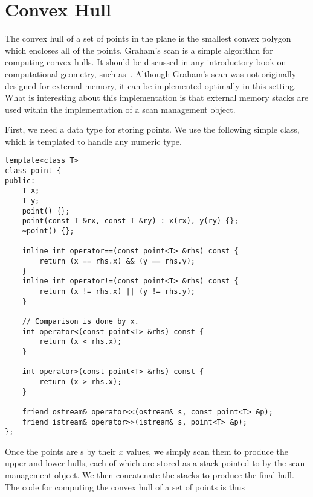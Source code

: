 \section{Convex Hull}
\label{sec:convex-hull}

The convex hull of a set of points in the plane is the smallest convex
polygon which encloses all of the points.  Graham's scan is a simple
algorithm for computing convex hulls.  It should be discussed in any
introductory book on computational geometry, such as~\cite{preparata:cg}.  Although Graham's scan was not originally designed for
external memory, it can be implemented optimally in this setting.
What is interesting about this implementation is that external memory
stacks are used within the implementation of a scan management object.

First, we need a data type for storing points.  We use the following
simple class, which is templated to handle any numeric type.

\begin{verbatim}
template<class T>
class point {
public:
    T x;
    T y;
    point() {};
    point(const T &rx, const T &ry) : x(rx), y(ry) {};
    ~point() {};

    inline int operator==(const point<T> &rhs) const {
        return (x == rhs.x) && (y == rhs.y);
    }
    inline int operator!=(const point<T> &rhs) const {
        return (x != rhs.x) || (y != rhs.y);
    }

    // Comparison is done by x.
    int operator<(const point<T> &rhs) const {
        return (x < rhs.x);
    }

    int operator>(const point<T> &rhs) const {
        return (x > rhs.x);
    }
    
    friend ostream& operator<<(ostream& s, const point<T> &p);
    friend istream& operator>>(istream& s, point<T> &p);
};
\end{verbatim}

Once the points are s by their $x$ values, we simply scan them to
produce the upper and lower hulls, each of which are stored as a stack
pointed to by the scan management object.  We then concatenate the
stacks to produce the final hull.  The code for computing the convex
hull of a set of points is thus


